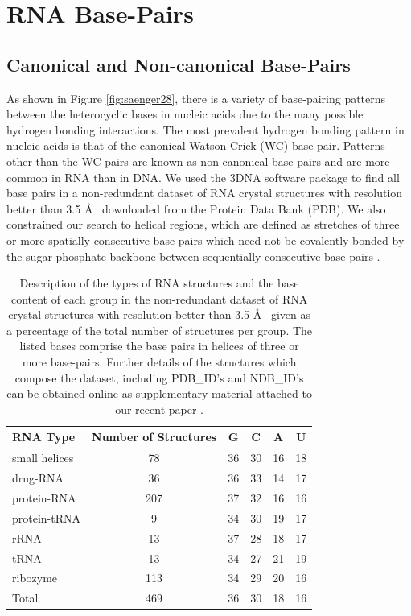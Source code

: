 \chapter{RNA Base-Pairs}
\label{basepairs} 

\section{Canonical and Non-canonical Base-Pairs}
As  shown  in  Figure  \ref{fig:saenger28},  there  is  a  variety  of
base-pairing patterns between the  heterocyclic bases in nucleic acids
due  to the  many possible  hydrogen bonding  interactions.   The most
prevalent hydrogen  bonding pattern  in nucleic acids  is that  of the
canonical  Watson-Crick (WC)  base-pair.  Patterns  other than  the WC
pairs are known as non-canonical base pairs and are more common in RNA
than in DNA.  We used  the 3DNA \cite{lu2003} software package to find
all base  pairs in a  non-redundant dataset of RNA  crystal structures
with resolution better than 3.5  \AA~ downloaded from the Protein Data
Bank (PDB).  We also constrained  our search to helical regions, which
are  defined  as stretches  of  three  or  more spatially  consecutive
base-pairs which need not  be covalently bonded by the sugar-phosphate
backbone between sequentially consecutive base pairs \cite{olson2009}.

\begin{table}[htbp]
\begin{center}
\begin{tabular}{|l|c|r|r|r|r|}
\hline
RNA Type & \multicolumn{1}{p{2cm}|}{Number of Structures} & \multicolumn{1}{c|}{G} &
\multicolumn{1}{c|}{C} & \multicolumn{1}{c|}{A} &
\multicolumn{1}{c|}{U} \\ \hline 
small helices & 78 & 36 & 30 & 16 & 18 \\ \hline
drug-RNA & 36 & 36 & 33 & 14 & 17 \\ \hline
protein-RNA & 207 & 37 & 32 & 16 & 16 \\ \hline
protein-tRNA & 9 & 34 & 30 & 19 & 17 \\ \hline
rRNA & 13 & 37 & 28 & 18 & 17 \\ \hline
tRNA & 13 & 34 & 27 & 21 & 19 \\ \hline
ribozyme & 113 & 34 & 29 & 20 & 16 \\ \hline
Total & 469 & \multicolumn{1}{c|}{36} & \multicolumn{1}{c|}{30} & \multicolumn{1}{c|}{18} & \multicolumn{1}{c|}{16} \\ \hline
\end{tabular}
\caption{Description  of the  types  of RNA  structures  and the  base
  content of  each group in  the non-redundant dataset of  RNA crystal
  structures with resolution better than 3.5 \AA~ given as a percentage
  of  the total  number of  structures  per group.   The listed  bases
  comprise  the base  pairs in  helices of  three or  more base-pairs.
  Further details of the structures which compose the dataset, including
  PDB\_ID's  and NDB\_ID's  can  be obtained  online as  supplementary
  material attached to our recent paper \cite{olson2009}.}
\label{tab:dbase}
\end{center}
\end{table}

